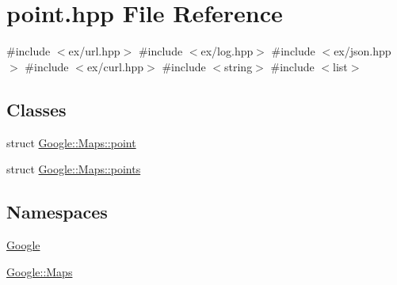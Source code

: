 \hypertarget{a00029}{}\section{point.\+hpp File Reference}
\label{a00029}
{\ttfamily \#include $<$ex/url.\+hpp$>$}\newline
{\ttfamily \#include $<$ex/log.\+hpp$>$}\newline
{\ttfamily \#include $<$ex/json.\+hpp$>$}\newline
{\ttfamily \#include $<$ex/curl.\+hpp$>$}\newline
{\ttfamily \#include $<$string$>$}\newline
{\ttfamily \#include $<$list$>$}\newline
\subsection*{Classes}
\begin{DoxyCompactItemize}
\item 
struct \hyperlink{a00059}{Google\+::\+Maps\+::point}
\item 
struct \hyperlink{a00063}{Google\+::\+Maps\+::points}
\end{DoxyCompactItemize}
\subsection*{Namespaces}
\begin{DoxyCompactItemize}
\item 
 \hyperlink{a00038}{Google}
\item 
 \hyperlink{a00039}{Google\+::\+Maps}
\end{DoxyCompactItemize}
